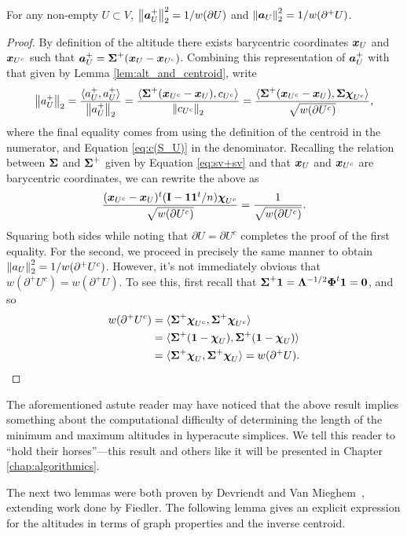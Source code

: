 \begin{lemma}
\label{lem:||alt||}
For any non-empty $U\subset V$, $\norm{\vb*{a}^+_U}_2^2=1/w(\partial U)$ and $\norm{\vb*{a}_U}_2^2 = 1/w(\partial^+ U)$.  
\end{lemma}
\begin{proof}
By definition of the altitude there exists barycentric coordinates $\vb*{x}_U$ and $\vb*{x}_{U^c}$ such that $\vb*{a}^+_U = \boldsymbol{\Sigma}^+(\vb*{x}_U-\vb*{x}_{U^c})$. Combining this representation of $\vb*{a}^+_U$ with that given by Lemma \ref{lem:alt_and_centroid}, write 
\begin{align*}
    \norm{a^+_U}_2 = \frac{\langle a^+_U,a^+_U\rangle }{\norm{a^+_U}_2} = \frac{\langle \boldsymbol{\Sigma}^+(\vb*{x}_{U^c}-\vb*{x}_{U}), c_{U^c}\rangle }{\norm{c_{U^c}}_2} = \frac{\langle \boldsymbol{\Sigma}^+(\vb*{x}_{U^c}-\vb*{x}_{U}), \boldsymbol{\Sigma}\boldsymbol{\chi}_{U^c}\rangle }{\sqrt{w(\partial U^c)}},
\end{align*}
where the final equality comes from using the definition of the centroid in the numerator, and Equation \ref{eq:c(S_U)} in the denominator. Recalling the relation between $\boldsymbol{\Sigma}$ and $\boldsymbol{\Sigma}^+$ given by Equation \ref{eq:sv+sv} and that $\vb*{x}_U$ and $\vb*{x}_{U^c}$ are barycentric coordinates, we can rewrite the above as 
\[\frac{(\vb*{x}_{U^c}-\vb*{x}_{U})^t(\vb{I}-\vb{1}\vb{1}^t/n)\boldsymbol{\chi}_{U^c}}{\sqrt{w(\partial U^c)}}=\frac{1}{\sqrt{w(\partial U^c)}}. \]
Squaring both sides while noting that $\partial U = \partial U^c$ completes the proof of the first equality. For the second, we proceed in precisely the same manner to obtain $\norm{a_U}_2^2 = 1/w(\partial^+ U^c)$. However, it's not immediately obvious that $w(\partial^+U^c)=w(\partial^+U)$. To see this, first recall that $\boldsymbol{\Sigma}^+\vb{1} = \vb{\Lambda}^{-1/2}\boldsymbol{\Phi}^t\vb{1} = \vb{0}$, and so 
\begin{align*}
w(\partial^+ U^c) &= \langle \boldsymbol{\Sigma}^+\boldsymbol{\chi}_{U^c},\boldsymbol{\Sigma}^+\boldsymbol{\chi}_{U^c}\rangle  \\
&= \langle \boldsymbol{\Sigma}^+(\vb{1} - \boldsymbol{\chi}_{U}),\boldsymbol{\Sigma}^+(\vb{1} - \boldsymbol{\chi}_{U})\rangle  \\
&= \langle \boldsymbol{\Sigma}^+\boldsymbol{\chi}_{U},\boldsymbol{\Sigma}^+\boldsymbol{\chi}_{U}\rangle = w(\partial^+ U).
\qedhere
\end{align*}
\end{proof}

The aforementioned astute reader may have noticed that the above result implies something about the computational difficulty of determining the length of the minimum and maximum altitudes in hyperacute simplices. We tell this reader to ``hold their horses''---this result and others like it will be presented in Chapter \ref{chap:algorithmics}. 

The next two lemmas were both proven by Devriendt and Van Mieghem~\cite{devriendt2018simplex}, extending work done by Fiedler. 
The following lemma gives an explicit expression for the altitudes in terms of graph properties and the inverse centroid. 

